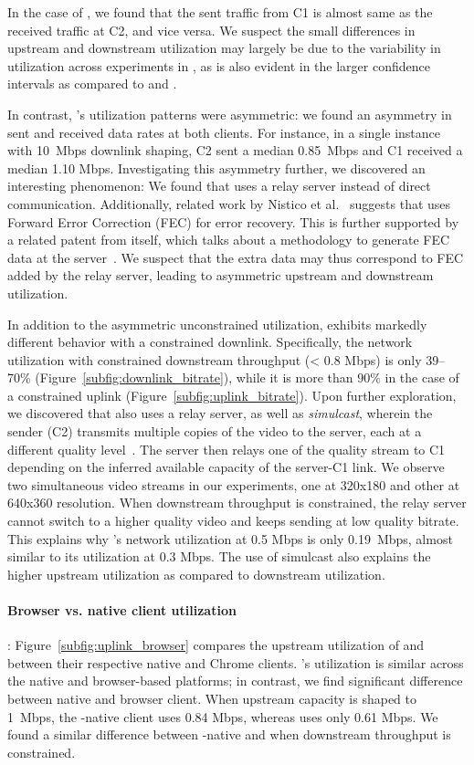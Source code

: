 In the case of \teams, we found that the sent traffic from C1
is almost same as the received traffic at C2, and vice versa. 
We suspect the small
differences in upstream and downstream utilization may largely be due to the
variability in utilization across experiments in \teams, as is
also evident in the larger confidence intervals as compared to \zoom and \meet. 

In contrast, \zoom's utilization patterns were asymmetric: we found an
asymmetry in sent and received data rates at both clients. For instance, in a
single instance with 10~Mbps downlink shaping, C2 sent a median 0.85~Mbps and
C1 received a median 1.10 Mbps. Investigating this asymmetry further, we
discovered an interesting phenomenon: We found that \zoom uses a relay server
instead of direct communication. Additionally, related work by Nistico et
al.~\cite{nistico2020comparative} suggests that \zoom uses Forward Error
Correction (FEC) for error recovery. This is further supported by a related
patent from \zoom itself, which talks about a methodology to generate FEC data
at the server~\cite{liu2019error}. We suspect that the extra data may thus
correspond to FEC added by the relay server, leading to asymmetric upstream and
downstream utilization.  

In addition to the asymmetric unconstrained utilization, \meet exhibits
markedly different behavior with a constrained downlink.
Specifically, the
network utilization with constrained downstream throughput (< 0.8 Mbps) is
only 39--70\%
(Figure~\ref{subfig:downlink_bitrate}), while it is more than $90\%$ in the
case of a constrained uplink (Figure~\ref{subfig:uplink_bitrate}). Upon
further exploration, we discovered that
\meet also uses a relay server, as well as
\textit{simulcast}, wherein the sender (C2) transmits multiple copies of the
video to the server, each at a different quality
level~\cite{nistico2020comparative}. The server then relays one of the quality
stream to C1 depending on the inferred available capacity of the server-C1
link. We observe two simultaneous video streams in our experiments, one at
320x180 and other at 640x360 resolution. When downstream throughput is
constrained, the relay
server cannot switch to a higher quality video and keeps sending at low
quality bitrate. This explains why \meet's network utilization at 0.5 Mbps is
only 0.19~Mbps, almost similar to its utilization at 0.3 Mbps.  The use of
simulcast also explains the higher upstream utilization as compared to
downstream utilization. 

\paragraph{Browser vs. native client utilization}:
Figure~\ref{subfig:uplink_browser} compares the upstream utilization of \zoom
and \teams between their respective native and Chrome clients. \zoom's
utilization is similar across the native and browser-based platforms; in
contrast, we find significant difference between \teams native and browser
client. When upstream capacity is shaped to 1~Mbps, the \teams-native client
uses 0.84 Mbps, whereas \teamsbrowser uses only 0.61 Mbps. We found a
similar difference between \teams-native and \teamsbrowser when downstream
throughput is constrained. 

